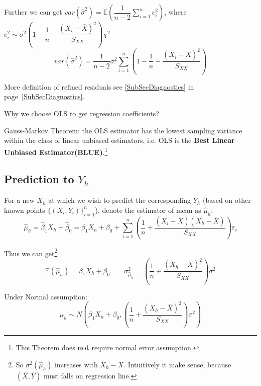     Further we can get $ var(\hat{\sigma }^2)=\mathbb{E}(\dfrac{1}{n-2}\sum_{i=1}^ne_i^2) $, where $ e_i^2\sim \sigma ^2\left( 1-\dfrac{1}{n}-\dfrac{(X_i-\bar{X})^2}{S_{XX}} \right)\chi^2 $
    \begin{equation}
        var(\hat{\sigma }^2)=\dfrac{1}{n-2}\sigma ^2\sum_{i=1}^n(1-\dfrac{1}{n}-\dfrac{(X_i-\bar{X})^2}{S_{XX}})
    \end{equation}
    
    More definition of refined residuals see \autoref{SubSecDiagnostics} in page~\ref{SubSecDiagnostics}.
    


\begin{point}
    Why we choose OLS to get regression coefficients?
\end{point}

    Gauss-Markov Theorem: the OLS estimator has the lowest sampling variance within the class of linear unbiased estimators, i.e. OLS is the \textbf{Best Linear Unbiased Estimator(BLUE)}.\footnote{This Theorem does \textbf{not }require normal error assumption.}



\subsection{Prediction to $ Y_h $}
    For a new $ X_h $ at which we wish to {predict }the corresponding $ Y_h $ (based on other known points $ \{(X_i,Y_i)\}_{i=1}^n $), denote the estimator of mean as $ \hat{\mu}_h $:
    \begin{equation}
        \hat{\mu}_h=\hat{\beta}_1X_h+\hat{\beta}_0 =\beta_1X_h+\beta _0+\sum_{i=1}^n\left( \dfrac{1}{n}+\dfrac{(X_i-\bar{X})(X_h-\bar{X})}{S_{XX}} \right)\varepsilon _i
    \end{equation}
    
    Thus we can get\footnote{So $ \sigma ^2(\hat{\mu }_h) $ increases with $ X_h-\bar{X} $. Intuitively it make sense, because $ (\bar{X},\bar{Y})$ must falls on regression line.}
    \begin{equation}
        \mathbb{E}(\hat{\mu}_h)= \beta _1X_h+\beta _0\qquad \sigma ^2_{\hat{\mu}_h}=\left( \dfrac{1}{n}+\dfrac{(X_h-\bar{X})^2}{S_{XX}} \right)\sigma^2
    \end{equation}
    
    Under Normal assumption:
    \begin{equation}
        \hat{\mu}_h\sim N(\beta _1X_h+\beta _0,\left( \dfrac{1}{n}+\dfrac{(X_h-\bar{X})^2}{S_{XX}} \right)\sigma^2) 
    \end{equation}
    
